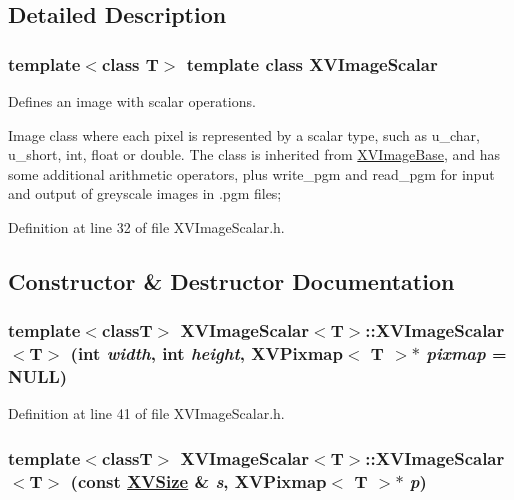 \subsection{Detailed Description}
\subsubsection*{template$<$class T$>$  template class XVImage\-Scalar}

Defines an image with scalar operations.

Image class where each pixel is represented by a scalar type, such as u\_\-char, u\_\-short, int, float or double.  The class is inherited from \hyperlink{class_XVImageBase}{XVImage\-Base}, and has some additional  arithmetic operators, plus write\_\-pgm and read\_\-pgm for input and output of greyscale images in .pgm files; 



Definition at line 32 of file XVImage\-Scalar.h.

\subsection{Constructor \& Destructor Documentation}
\label{XVImageScalar_a0}
\hypertarget{class_XVImageScalar_a0}{
\subsubsection[XVImageScalar]{\setlength{\rightskip}{0pt plus 5cm}template$<$classT$>$ XVImage\-Scalar$<$T$>$::XVImage\-Scalar$<$T$>$ (int {\em width}, int {\em height}, XVPixmap$<$ T $>$$\ast$ {\em pixmap} = NULL)}}




Definition at line 41 of file XVImage\-Scalar.h.\label{XVImageScalar_a1}
\hypertarget{class_XVImageScalar_a1}{
\subsubsection[XVImageScalar]{\setlength{\rightskip}{0pt plus 5cm}template$<$classT$>$ XVImage\-Scalar$<$T$>$::XVImage\-Scalar$<$T$>$ (const \hyperlink{class_XVSize}{XVSize} \& {\em s}, XVPixmap$<$ T $>$$\ast$ {\em p})}}




